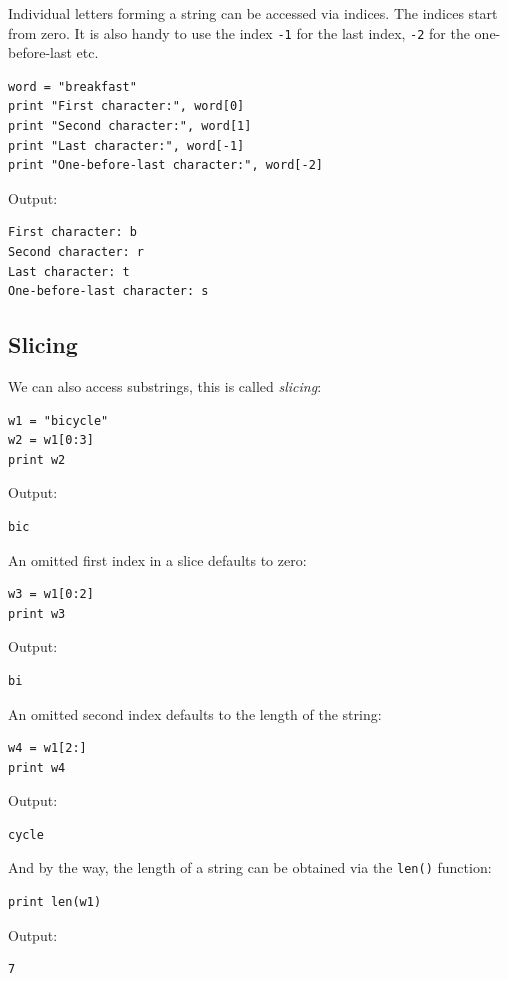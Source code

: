 Individual letters forming a string can be accessed via indices. The indices 
start from zero. It is also handy to use the index {\tt -1} 
for the last index, {\tt -2} for the one-before-last etc.

\begin{verbatim}
word = "breakfast"
print "First character:", word[0]
print "Second character:", word[1]
print "Last character:", word[-1]
print "One-before-last character:", word[-2]
\end{verbatim}
Output:

\begin{verbatim}
First character: b
Second character: r
Last character: t
One-before-last character: s
\end{verbatim}

\subsection{Slicing}

We can also access substrings, this is called {\em slicing}:

\begin{verbatim}
w1 = "bicycle"
w2 = w1[0:3]
print w2
\end{verbatim}
Output:

\begin{verbatim}
bic
\end{verbatim}
An omitted first index in a slice defaults to zero:

\begin{verbatim}
w3 = w1[0:2]
print w3
\end{verbatim}
Output:

\begin{verbatim}
bi
\end{verbatim}
An omitted second index defaults to the length of the string:

\begin{verbatim}
w4 = w1[2:]
print w4
\end{verbatim}
Output:

\begin{verbatim}
cycle
\end{verbatim}
And by the way, the length of a string can be obtained via the {\tt len()} function:

\begin{verbatim}
print len(w1)
\end{verbatim}
Output:

\begin{verbatim}
7
\end{verbatim}

